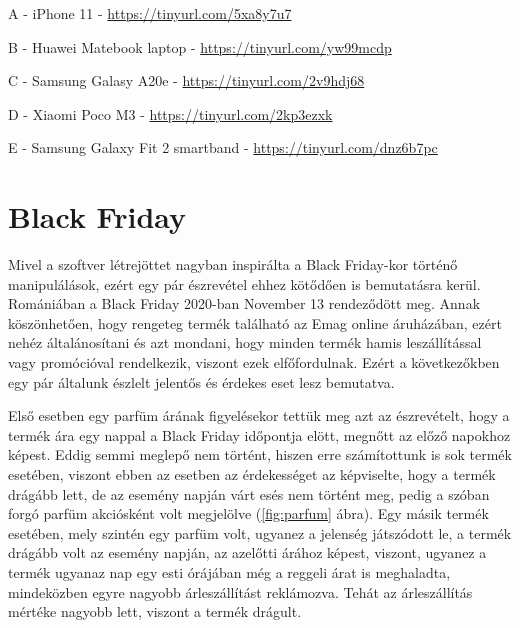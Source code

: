 A - iPhone 11 - \url{https://tinyurl.com/5xa8y7u7} 

B - Huawei Matebook laptop - \url{https://tinyurl.com/yw99mcdp}

C - Samsung Galasy A20e - \url{https://tinyurl.com/2v9hdj68}

D - Xiaomi Poco M3 - \url{https://tinyurl.com/2kp3ezxk}

E - Samsung Galaxy Fit 2 smartband - \url{https://tinyurl.com/dnz6b7pc}

\section{Black Friday}

Mivel a szoftver létrejöttet nagyban inspirálta a Black Friday-kor történő manipulálások, ezért egy pár észrevétel ehhez kötődően is bemutatásra kerül. Romániában a Black Friday 2020-ban November 13 rendeződött meg. Annak köszönhetően, hogy rengeteg termék található az Emag online áruházában, ezért nehéz általánosítani és azt mondani, hogy minden termék hamis leszállítással vagy promócióval rendelkezik, viszont ezek elfőfordulnak. Ezért a következőkben egy pár általunk észlelt jelentős és érdekes eset lesz bemutatva.

Első esetben egy parfüm árának figyelésekor tettük meg azt az észrevételt, hogy a termék ára egy nappal a Black Friday időpontja elött, megnőtt az előző napokhoz képest. Eddig semmi meglepő nem történt, hiszen erre számítottunk is sok termék esetében, viszont ebben az esetben az érdekességet az képviselte, hogy a termék drágább lett, de az esemény napján várt esés nem történt meg, pedig a szóban forgó parfüm akciósként volt megjelölve (\ref{fig:parfum} ábra). Egy másik termék esetében, mely szintén egy parfüm volt, ugyanez a jelenség játszódott le, a termék drágább volt az esemény napján, az azelőtti árához képest, viszont, ugyanez a termék ugyanaz nap egy esti órájában még a reggeli árat is meghaladta, mindeközben egyre nagyobb árleszállítást reklámozva. Tehát az árleszállítás mértéke nagyobb lett, viszont a termék drágult.

